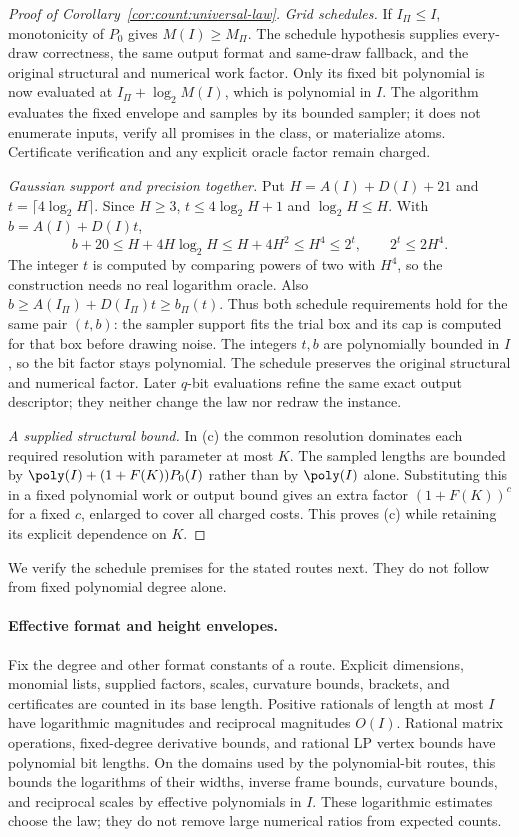 \begin{proof}[Proof of Corollary~\ref{cor:count:universal-law}]
\emph{Grid schedules.} If $I_\Pi\le I$, monotonicity of $P_0$ gives
$M(I)\ge M_\Pi$. The schedule hypothesis supplies every-draw correctness,
the same output format and same-draw fallback, and the original structural
and numerical work factor. Only its fixed bit polynomial is now evaluated
at $I_\Pi+\log_2M(I)$, which is polynomial in $I$. The algorithm evaluates
the fixed envelope and samples by its bounded sampler; it does not
enumerate inputs, verify all promises in the class, or materialize atoms.
Certificate verification and any explicit oracle factor remain charged.

\emph{Gaussian support and precision together.} Put $H=A(I)+D(I)+21$
and $t=\lceil4\log_2H\rceil$. Since $H\ge3$,
$t\le4\log_2H+1$ and $\log_2H\le H$. With $b=A(I)+D(I)t$,
\[
 b+20\le H+4H\log_2H\le H+4H^2\le H^4\le2^t,
 \qquad 2^t\le2H^4.
\]
The integer $t$ is computed by comparing powers of two with $H^4$,
so the construction needs no real logarithm oracle.
Also $b\ge A(I_\Pi)+D(I_\Pi)t\ge b_\Pi(t)$. Thus both schedule
requirements hold for the same pair $(t,b)$: the sampler support fits the
trial box and its cap is computed for that box before drawing noise. The
integers $t,b$ are polynomially bounded in $I$, so the bit factor stays
polynomial. The schedule preserves the original structural and numerical
factor. Later $q$-bit evaluations refine the same exact output descriptor;
they neither change the law nor redraw the instance.

\emph{A supplied structural bound.} In (c) the common resolution dominates
each required resolution with parameter at most $K$. The sampled lengths
are bounded by $\poly(I)+(1+F(K))P_0(I)$ rather than by $\poly(I)$ alone.
Substituting this in a fixed polynomial work or output bound gives an
extra factor $(1+F(K))^c$ for a fixed $c$, enlarged to cover all charged
costs. This proves (c) while retaining its explicit dependence on $K$.
\end{proof}

We verify the schedule premises for the stated routes next. They do not
follow from fixed polynomial degree alone.

\paragraph{Effective format and height envelopes.}
Fix the degree and other format constants of a route. Explicit dimensions,
monomial lists, supplied factors, scales, curvature bounds, brackets, and
certificates are counted in its base length. Positive rationals of length
at most $I$ have logarithmic magnitudes and reciprocal magnitudes $O(I)$.
Rational matrix operations, fixed-degree derivative bounds, and rational
LP vertex bounds have polynomial bit lengths. On the domains used by the
polynomial-bit routes, this bounds the logarithms of their widths, inverse
frame bounds, curvature bounds, and reciprocal scales by effective
polynomials in $I$. These logarithmic estimates choose the law; they do
not remove large numerical ratios from expected counts.

